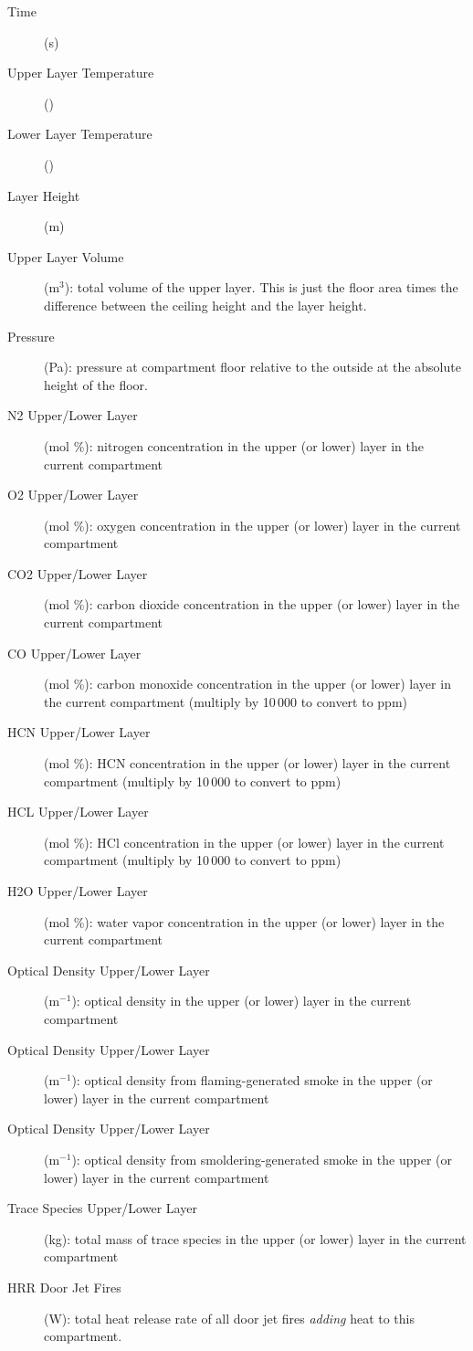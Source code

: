 \begin{description}
\item[Time] (s)
\item[Upper Layer Temperature] (\degc)
\item[Lower Layer Temperature] (\degc)
\item[Layer Height]  (m)
\item[ Upper Layer Volume] (m$^3$): total volume of the upper layer. This is just the floor area times the difference between the ceiling height and the layer height.
\item[ Pressure] (Pa): pressure at compartment floor relative to the outside at the absolute height of the floor.
\item[N2 Upper/Lower Layer] (mol \%): nitrogen concentration in the upper (or lower) layer in the current compartment
\item[O2 Upper/Lower Layer] (mol \%): oxygen concentration in the upper (or lower) layer in the current compartment
\item[CO2 Upper/Lower Layer] (mol \%):  carbon dioxide concentration in the upper (or lower) layer in the current compartment
\item[CO Upper/Lower Layer] (mol \%):  carbon monoxide concentration in the upper (or lower) layer in the current compartment (multiply by 10\,000 to convert to ppm)
\item[HCN Upper/Lower Layer] (mol \%):  HCN concentration in the upper (or lower) layer in the current compartment (multiply by 10\,000 to convert to ppm)
\item[HCL Upper/Lower Layer] (mol \%):  HCl concentration in the upper (or lower) layer in the current compartment (multiply by 10\,000 to convert to ppm)
\item[H2O Upper/Lower Layer] (mol \%):  water vapor concentration in the upper (or lower) layer in the current compartment
\item[Optical Density Upper/Lower Layer] (m$^{-1}$):  optical density in the upper (or lower) layer in the current compartment
\item[Optical Density Upper/Lower Layer] (m$^{-1}$):  optical density from flaming-generated smoke in the upper (or lower) layer in the current compartment
\item[Optical Density Upper/Lower Layer] (m$^{-1}$):  optical density from smoldering-generated smoke in the upper (or lower) layer in the current compartment
\item[Trace Species Upper/Lower Layer] (kg):  total mass of trace species in the upper (or lower) layer in the current compartment
\item[HRR Door Jet Fires] (W): total heat release rate of all door jet fires \emph{adding} heat to this compartment.
\end{description}

